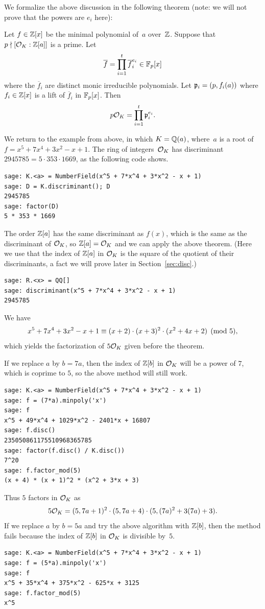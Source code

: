 We formalize the above discussion in the following theorem (note: we will
not prove that the powers are $e_i$ here):
\begin{theorem}\label{thm:fac1}
Let $f\in\mathbb{Z}[x]$ be the minimal polynomial of~$a$ over~$\mathbb{Z}$.
Suppose that~$p\nmid [\mathcal{O}_K:\mathbb{Z}[a]]$ is a prime.
Let
$$
 \overline{f} = \prod_{i=1}^t \overline{f}_i^{e_i} \in \mathbb{F}_p[x]
$$
where the $\overline{f}_i$ are distinct monic irreducible
polynomials.
Let
$
  \mathfrak{p}_i = (p,f_i(a))
$
where $f_i\in\mathbb{Z}[x]$ is a lift of $\overline{f}_i$ in $\mathbb{F}_p[x]$.
Then
$$
  p\mathcal{O}_K = \prod_{i=1}^t \mathfrak{p}_i^{e_i}.
$$
\end{theorem}

We return to the example from above, in which $K=\mathbb{Q}(a)$, where~$a$ is
a root of $f = x^5+7x^4+3x^2-x+1$.  The ring
of integers~$\mathcal{O}_K$ has discriminant $2945785 = 5\cdot 353\cdot 1669$,
as the following \sage code shows.
\begin{verbatim}
sage: K.<a> = NumberField(x^5 + 7*x^4 + 3*x^2 - x + 1)
sage: D = K.discriminant(); D
2945785
sage: factor(D)
5 * 353 * 1669
\end{verbatim}
The order $\mathbb{Z}[a]$ has the same discriminant as $f(x)$, which
is the same as the discriminant of $\mathcal{O}_K$, so
$\mathbb{Z}[a]=\mathcal{O}_K$ and we can apply the above theorem.
(Here we use that the index of $\mathbb{Z}[a]$ in $\mathcal{O}_K$
is the square of the quotient of their discriminants,
a fact we will prove later in Section~\ref{sec:disc}.)
\begin{verbatim}
sage: R.<x> = QQ[]
sage: discriminant(x^5 + 7*x^4 + 3*x^2 - x + 1)
2945785
\end{verbatim}
We have
$$
  x^5+7x^4+3x^2-x+1 \equiv (x+2)\cdot (x+3)^2 \cdot (x^2+4x+2)\pmod{5},
$$
which yields the factorization of $5\mathcal{O}_K$ given before the theorem.

If we replace $a$ by $b=7a$, then the index of $\mathbb{Z}[b]$
in $\mathcal{O}_K$ will be a power of $7$, which is coprime to $5$,
so the above method will still work.
\begin{verbatim}
sage: K.<a> = NumberField(x^5 + 7*x^4 + 3*x^2 - x + 1)
sage: f = (7*a).minpoly('x')
sage: f
x^5 + 49*x^4 + 1029*x^2 - 2401*x + 16807
sage: f.disc()
235050861175510968365785
sage: factor(f.disc() / K.disc())
7^20
sage: f.factor_mod(5)
(x + 4) * (x + 1)^2 * (x^2 + 3*x + 3)
\end{verbatim}
Thus $5$ factors in $\mathcal{O}_K$
as
$$
  5\mathcal{O}_K = (5, 7a+1)^2 \cdot (5, 7a+4) \cdot (5, (7a)^2 + 3(7a) + 3).
$$
If we replace $a$ by $b=5a$ and try the above algorithm with $\mathbb{Z}[b]$,
then the method fails because the index of $\mathbb{Z}[b]$ in $\mathcal{O}_K$ is divisible
by~$5$.
\begin{verbatim}
sage: K.<a> = NumberField(x^5 + 7*x^4 + 3*x^2 - x + 1)
sage: f = (5*a).minpoly('x')
sage: f
x^5 + 35*x^4 + 375*x^2 - 625*x + 3125
sage: f.factor_mod(5)
x^5
\end{verbatim}

